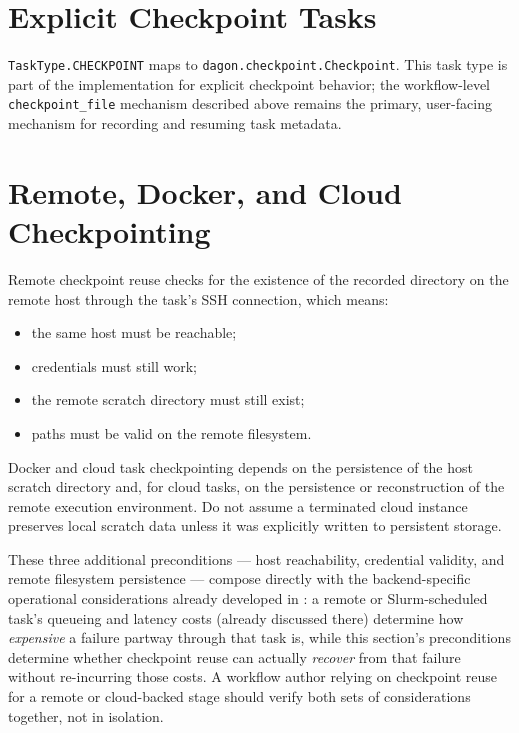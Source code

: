 \section{Explicit Checkpoint Tasks}

\texttt{TaskType.CHECKPOINT} maps to \texttt{dagon.checkpoint.Checkpoint}.
This task type is part of the implementation for explicit checkpoint
behavior; the workflow-level \texttt{checkpoint\_file} mechanism described
above remains the primary, user-facing mechanism for recording and resuming
task metadata.

\section{Remote, Docker, and Cloud Checkpointing}

Remote checkpoint reuse checks for the existence of the recorded directory
on the remote host through the task's SSH connection, which means:

\begin{itemize}[leftmargin=1.4em]
  \item the same host must be reachable;
  \item credentials must still work;
  \item the remote scratch directory must still exist;
  \item paths must be valid on the remote filesystem.
\end{itemize}

\begin{cautionbox}
Docker and cloud task checkpointing depends on the persistence of the host
scratch directory and, for cloud tasks, on the persistence or
reconstruction of the remote execution environment. Do not assume a
terminated cloud instance preserves local scratch data unless it was
explicitly written to persistent storage.
\end{cautionbox}

These three additional preconditions --- host reachability, credential
validity, and remote filesystem persistence --- compose directly with the
backend-specific operational considerations already developed in
: a remote or Slurm-scheduled task's queueing and latency
costs (already discussed there) determine how \emph{expensive} a failure
partway through that task is, while this section's preconditions determine
whether checkpoint reuse can actually \emph{recover} from that failure
without re-incurring those costs. A workflow author relying on checkpoint
reuse for a remote or cloud-backed stage should verify both sets of
considerations together, not in isolation.

